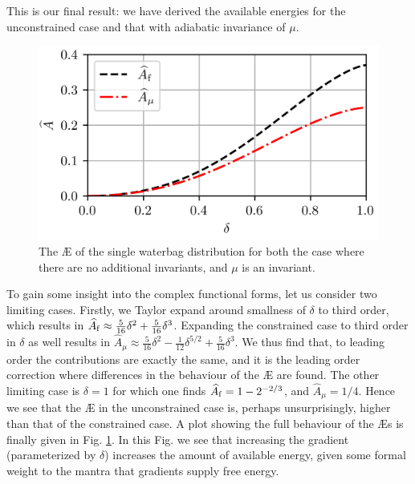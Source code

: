 This is our final result: we have derived the available energies for the unconstrained case and that with adiabatic invariance of $\mu$. \par 
\begin{figure}
    \centering
    \includegraphics{3_chapters/0_introduction/img/AE.png}
    \caption{The \AE{} of the single waterbag distribution for both the case where there are no additional invariants, and $\mu$ is an invariant.}
    \label{fig: aes of the example}
\end{figure}
To gain some insight into the complex functional forms, let us consider two limiting cases. Firstly, we Taylor expand around smallness of $\delta$ to third order, which results in $\widehat{A}_{\rm f}\approx \frac{5}{16} \delta^2 + \frac{5}{16} \delta^3$. Expanding the constrained case to third order in $\delta$ as well results in $\widehat{A}_\mu \approx \frac{5}{16} \delta^2 - \frac{1}{12}\delta^{5/2} + \frac{5}{16} \delta^3 $. We thus find that, to leading order the contributions are exactly the same, and it is the leading order correction where differences in the behaviour of the \AE{} are found. The other limiting case is $\delta=1$ for which one finds $\widehat{A}_{\rm f}=1-2^{-2/3}$, and $\widehat{A}_\mu=1/4$. Hence we see that the \AE{} in the unconstrained case is, perhaps unsurprisingly, higher than that of the constrained case. A plot showing the full behaviour of the \AE{}s is finally given in Fig. \ref{fig: aes of the example}. In this Fig. we see that increasing the gradient (parameterized by $\delta$) increases the amount of available energy, given some formal weight to the mantra that gradients supply free energy. \par

